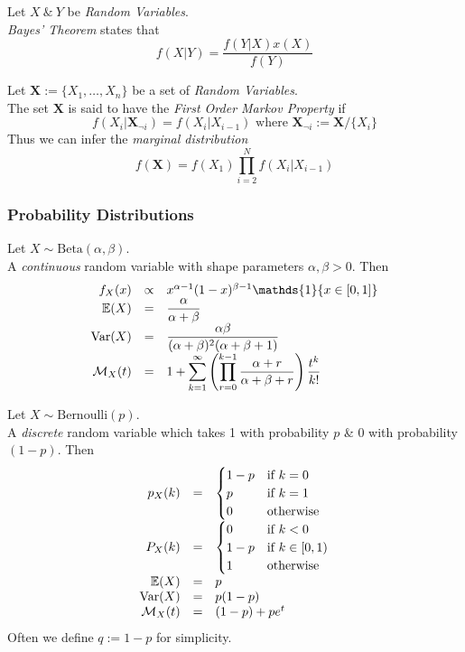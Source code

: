 \documentclass[11pt,a4paper]{article}
\begin{document}
Let $X\ \&\ Y$ be \textit{Random Variables}.\\
\textit{Bayes' Theorem} states that
$$f(X|Y)=\dfrac{f(Y|X)x(X)}{f(Y)}$$

Let $\textbf{X}:=\{X_1,\dots,X_n\}$ be a set of \textit{Random Variables}.\\
The set $\textbf{X}$ is said to have the \textit{First Order Markov Property} if
$$f(X_i|\textbf{X}_{\neg i})= f(X_i|X_{i-1})\text{ where }\textbf{X}_{\neg i}:=\textbf{X}/\{X_i\}$$
Thus we can infer the \textit{marginal distribution}
$$f(\textbf{X})=f(X_1)\prod_{i=2}^Nf(X_i|X_{i-1})$$

\subsubsection{Probability Distributions}

Let $X\sim\text{Beta}(\alpha,\beta)$.\\
A \textit{continuous} random variable with shape parameters $\alpha,\beta>0$. Then
\[\begin{array}{rcl}
f_X(x)&\propto&x^{\alpha-1}(1-x)^{\beta-1}\mathds{1}\{x\in[0,1]\}\\
\expect(X)&=&\dfrac{\alpha}{\alpha+\beta}\\
\var(X)&=&\dfrac{\alpha\beta}{(\alpha+\beta)^2(\alpha+\beta+1)}\\
\mathcal{M}_X(t)&=&1+{\displaystyle\sum_{k=1}^\infty\left(\prod_{r=0}^{k-1}\dfrac{\alpha+r}{\alpha+\beta+r}\right)\dfrac{t^k}{k!}}
\end{array}\]

Let $X\sim\text{Bernoulli}(p)$.\\
A \textit{discrete} random variable which takes 1 with probability $p$ \& 0 with probability $(1-p)$. Then
\[\begin{array}{rcl}
p_X(k)&=&\begin{cases}1-p&\text{if }k=0\\p&\text{if }k=1\\0&\text{otherwise}\end{cases}\\
P_X(k)&=&\begin{cases}0&\text{if }k<0\\1-p&\text{if }k\in[0,1)\\1&\text{otherwise}\end{cases}\\
\mathbb{E}(X)&=&p\\
\mathrm{Var}(X)&=&p(1-p)\\
\mathcal{M}_X(t)&=&(1-p)+pe^t
\end{array}\]
\nb Often we define $q:=1-p$ for simplicity.\\
\end{document}
